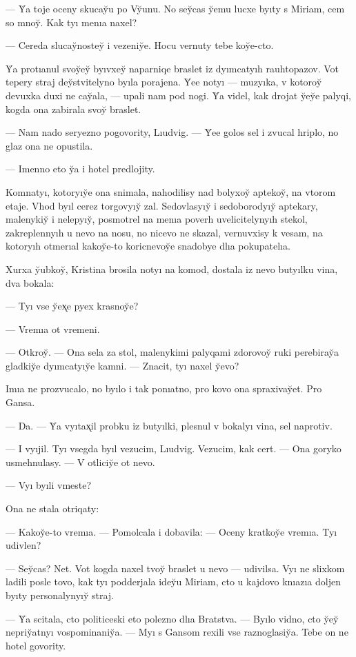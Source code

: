 \documentclass[10pt]{book}
\begin{document}
— Y̆a toje oceny skucay̆u po Vy̆unu. No sey̆cas y̆emu lucxe byıty s Miriam, cem so mnoy̆. Kak tyı menıa naxel?

— Cereda slucay̆nostey̆ i vezeniy̆e. Hocu vernuty tebe koy̆e-cto.

Y̆a protıanul svoy̆ey̆ byıvxey̆ naparniqe braslet iz dyımcatyıh rauhtopazov. Vot tepery straj dey̆stvitelyno byıla porajena. Y̆ee notyı — muzyıka, v kotoroy̆ devuxka duxi ne cay̆ala, — upali nam pod nogi. Y̆a videl, kak drojat y̆ey̆e palyqi, kogda ona zabirala svoy̆ braslet.

— Nam nado seryezno pogovority, Lıudvig. — Y̆ee golos sel i zvucal hriplo, no glaz ona ne opustila.

— Imenno eto y̆a i hotel predlojity.



Komnatyı, kotoryıy̆e ona snimala, nahodilisy nad bolyxoy̆ aptekoy̆, na vtorom etaje. Vhod byıl cerez torgovyıy̆ zal. Sedovlasyıy̆ i sedoborodyıy̆ aptekary, malenykiy̆ i nelepyıy̆, posmotrel na menıa poverh uvelicitelynyıh stekol, zakreplennyıh u nevo na nosu, no nicevo ne skazal, vernuvxisy k vesam, na kotoryıh otmerıal kakoy̆e-to koricnevoy̆e snadobye dlıa pokupatelıa.

Xurxa y̆ubkoy̆, Kristina brosila notyı na komod, dostala iz nevo butyılku vina, dva bokala:

— Tyı vse y̆ex̨e pyex krasnoy̆e?

— Vremıa ot vremeni.

— Otkroy̆. — Ona sela za stol, malenykimi palyqami zdorovoy̆ ruki perebiray̆a gladkiy̆e dyımcatyıy̆e kamni. — Znacit, tyı naxel y̆evo?

Imıa ne prozvucalo, no byılo i tak ponıatno, pro kovo ona spraxivay̆et. Pro Gansa.

— Da. — Y̆a vyıtax̨il probku iz butyılki, plesnul v bokalyı vina, sel naprotiv.

— I vyıjil. Tyı vsegda byıl vezucim, Lıudvig. Vezucim, kak cert. — Ona goryko usmehnulasy. — V otliciy̆e ot nevo.

— Vyı byıli vmeste?

Ona ne stala otriqaty:

— Kakoy̆e-to vremıa. — Pomolcala i dobavila: — Oceny kratkoy̆e vremıa. Tyı udivlen?

— Sey̆cas? Net. Vot kogda naxel tvoy̆ braslet u nevo — udivilsa. Vyı ne slixkom ladili posle tovo, kak tyı podderjala idey̆u Miriam, cto u kajdovo knıazıa doljen byıty personalynyıy̆ straj.

— Y̆a scitala, cto politiceski eto polezno dlıa Bratstva. — Byılo vidno, cto y̆ey̆ nepriy̆atnyı vospominaniy̆a. — Myı s Gansom rexili vse raznoglasiy̆a. Tebe on ne hotel govority.
\end{document}
